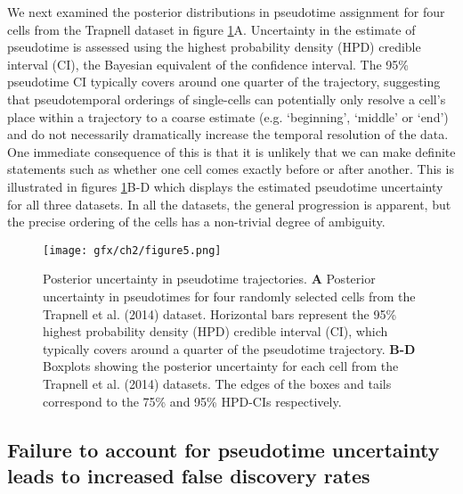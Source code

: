 We next examined the posterior distributions in pseudotime assignment for four cells from the Trapnell dataset in figure \ref{fig:posuncert}A. Uncertainty in the estimate of pseudotime is assessed using the highest probability density (HPD) credible interval (CI), the Bayesian equivalent of the confidence interval. The 95\% pseudotime CI typically covers around one quarter of the trajectory, suggesting that pseudotemporal orderings of single-cells can potentially only resolve a cell's place within a trajectory to a coarse estimate (e.g. `beginning', `middle' or `end') and do not necessarily dramatically increase the temporal resolution of the data. One immediate consequence of this is that it is unlikely that we can make definite statements such as whether one cell comes exactly before or after another. This is illustrated in figures \ref{fig:posuncert}B-D which displays the estimated pseudotime uncertainty for all three datasets. In all the datasets, the general progression is apparent, but the precise ordering of the cells has a non-trivial degree of ambiguity.

\begin{figure}
\centering
	\texttt{[image: gfx/ch2/figure5.png]}
    \caption[Posterior uncertainty in pseudotime trajectories.]{ Posterior uncertainty in pseudotime trajectories.  \textbf{A} Posterior uncertainty in pseudotimes for four randomly selected cells from the Trapnell et al. (2014) dataset. Horizontal bars represent the 95\% highest probability density (HPD) credible interval (CI), which typically covers around a quarter of the pseudotime trajectory. \textbf{B-D} Boxplots showing the posterior uncertainty for each cell from the Trapnell et al. (2014) datasets. The edges of the boxes and tails correspond to the 75\% and 95\% HPD-CIs respectively.} \label{fig:posuncert}
\end{figure}


\subsection{Failure to account for pseudotime uncertainty leads to increased false discovery rates}

